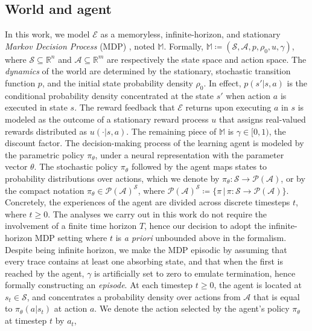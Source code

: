 \subsection*{World and agent}

In this work, we model $\mathcal{E}$ as a memoryless, infinite-horizon, and stationary
\emph{Markov Decision Process} (MDP) \cite{Puterman1994-pf}, noted $\mathbb{M}$.
Formally, $\mathbb{M} \coloneqq (\mathcal{S}, \mathcal{A}, p, \rho_0, u, \gamma)$, where
$\mathcal{S} \subseteq \mathbb{R}^n$ and $\mathcal{A} \subseteq \mathbb{R}^m$
are respectively the state space and action space.
The \emph{dynamics} of the world are determined by the stationary, stochastic transition function $p$, and
the initial state probability density $\rho_0$.
In effect, $p(s' | s, a)$ is the conditional probability density
concentrated at the state $s'$ when action $a$ is executed in state $s$.
The reward feedback that $\mathcal{E}$ returns upon executing $a$ in $s$ is modeled as the outcome of
a stationary reward process $u$ that assigns real-valued rewards
distributed as $u(\cdot | s, a)$.
The remaining piece of $\mathbb{M}$ is $\gamma \in [0, 1)$, the discount factor.
The decision-making process of the learning agent is modeled by the parametric policy $\pi_\theta$,
under a neural representation with the parameter vector $\theta$.
The stochastic policy $\pi_\theta$ followed by the agent
maps states to probability distributions over actions, which we denote by
$\pi_\theta : \mathcal{S} \to \mathcal{P}(\mathcal{A})$, or by the compact notation
$\pi_\theta \in \mathcal{P}(\mathcal{A})^\mathcal{S}$, where
$\mathcal{P}(\mathcal{A})^\mathcal{S}
\coloneqq \{ \pi \, | \, \pi: \mathcal{S} \to \mathcal{P}(\mathcal{A}) \}$.
Concretely, the experiences of the agent are divided across discrete timesteps $t$, where $t\geq0$.
The analyses we carry out in this work do not require the involvement of a finite time horizon $T$,
hence our decision to adopt the infinite-horizon MDP setting
where $t$ is \textit{a priori} unbounded above in the
formalism.
Despite being infinite horizon, we make the MDP episodic
by assuming that every trace contains at least one absorbing state,
and that when the first is reached by the agent, $\gamma$ is artificially set to zero
to emulate termination, hence formally constructing an \textit{episode}.
At each timestep $t\geq0$, the agent is located at $s_t \in \mathcal{S}$,
and concentrates a probability density over actions from $\mathcal{A}$ that is equal to
$\pi_\theta(a | s_t)$ at action $a$.
We denote the action selected by the agent's policy $\pi_\theta$ at timestep $t$ by $a_t$,
